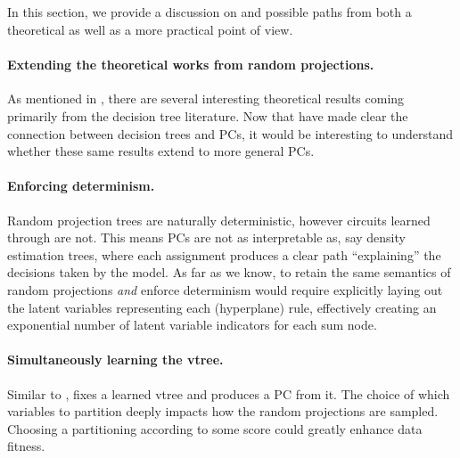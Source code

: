 \subsection{}

In this section, we provide a discussion on  and possible paths from both a
theoretical as well as a more practical point of view.

\paragraph{Extending the theoretical works from random projections.} As mentioned in ,
there are several interesting theoretical results coming primarily from the decision tree
literature. Now that \citet{correia20} have made clear the connection between decision trees and
PCs, it would be interesting to understand whether these same results extend to more general PCs.

\paragraph{Enforcing determinism.} Random projection trees are naturally deterministic, however
circuits learned through  are not. This means  PCs are not as
interpretable as, say density estimation trees, where each assignment produces a clear path
``explaining'' the decisions taken by the model. As far as we know, to retain the same semantics of
random projections \emph{and} enforce determinism would require explicitly laying out the latent
variables representing each (hyperplane) rule, effectively creating an exponential number of latent
variable indicators for each sum node.

\paragraph{Simultaneously learning the vtree.} Similar to , 
fixes a learned vtree and produces a PC from it. The choice of which variables to partition deeply
impacts how the random projections are sampled. Choosing a partitioning according to some score
could greatly enhance data fitness.

